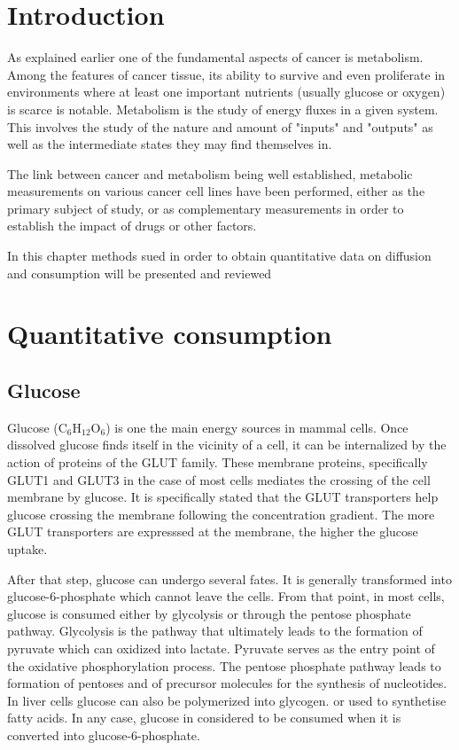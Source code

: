 \documentclass[11pt,a4paper]{article}
\begin{document}
\section{Introduction}
As explained earlier one of the fundamental aspects of cancer is metabolism. Among the features of cancer tissue, its ability to survive and even proliferate in environments where at least one important nutrients (usually glucose or oxygen) is scarce is notable. Metabolism is the study of energy fluxes in a given system. This involves the study of the nature and amount of "inputs" and "outputs" as well as the intermediate states they may find themselves in.


The link between cancer and metabolism being well established, metabolic measurements on various cancer cell lines have been performed, either as the primary subject of study, or as complementary measurements in order to establish the impact of drugs or other factors.

In this chapter methods sued in order to obtain quantitative data on diffusion and consumption will be presented and reviewed

\section{Quantitative consumption}
\subsection{Glucose}
Glucose (C$_6$H$_{12}$O$_6$) is one the main energy sources in mammal cells. Once dissolved glucose finds itself in the vicinity of a cell, it can be internalized by the action of proteins of the GLUT family. These membrane proteins, specifically GLUT1 and GLUT3 in the case of most cells mediates the crossing of the cell membrane by glucose.\cite{Berg2006} It is specifically stated that the GLUT transporters help glucose crossing the membrane following the concentration gradient.\cite{Macheda2005}  The more GLUT transporters are expresssed at the membrane, the higher the glucose uptake.

After that step, glucose can undergo several fates. It is generally transformed into glucose-6-phosphate which cannot leave the cells. From that point, in most cells, glucose is consumed either by glycolysis or through the pentose phosphate pathway. Glycolysis is the pathway that ultimately leads to the formation of pyruvate which can oxidized into lactate. Pyruvate serves as the entry point of the oxidative phosphorylation process. The pentose phosphate pathway leads to formation of pentoses and of precursor molecules for the synthesis of nucleotides. In liver cells glucose can also be polymerized into glycogen. or used to synthetise fatty acids. In any case, glucose in considered to be consumed when it is converted into glucose-6-phosphate. %
\end{document}
